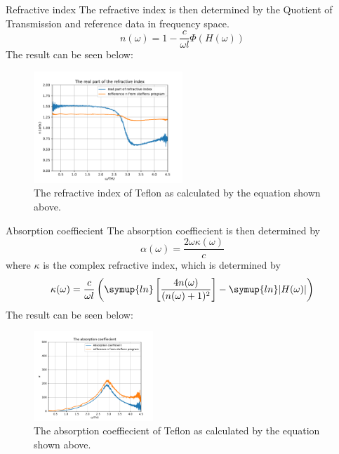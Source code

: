 \documentclass[aspectratio=1610, 9pt]{beamer}
\begin{document}
\begin{frame}{Refractive index}
  The refractive index is then determined by the Quotient of Transmission and reference data in frequency space.
  \begin{equation}
    n(\omega) = 1 - \frac{c}{\omega l} \Phi(H(\omega))
  \end{equation}
  The result can be seen below:
  \begin{center}
    \begin{figure}
      \includegraphics[width=0.5\textwidth]{images/THz5_1.pdf}
      \caption{The refractive index of Teflon as calculated by the equation shown above.}
    \end{figure}
  \end{center}
\end{frame}

\begin{frame}{Absorption coeffiecient}
  The absorption coeffiecient is then determined by
  \begin{equation}
    \alpha(\omega) = \frac{2 \omega \kappa(\omega)}{c}
  \end{equation}
  where $\kappa$ is the complex refractive index, which is determined by 
  \begin{equation}
    \kappa(\omega) = \frac{c}{\omega l } \left( \symup{ln}\left[ \frac{4 n(\omega)}{(n(\omega) + 1)^2}\right] - \symup{ln}|H(\omega)|\right)
  \end{equation}
  The result can be seen below:
  \begin{center}
    \begin{figure}
      \includegraphics[width=0.4\textwidth]{images/THz6.pdf}
      \caption{The absorption coeffiecient of Teflon as calculated by the equation shown above.}
    \end{figure}
  \end{center}
\end{frame}
\end{document}
